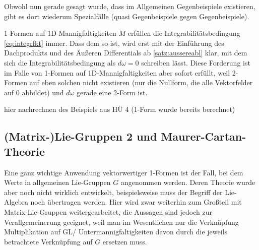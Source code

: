 \documentclass[../H_Analysis_main.tex]{subfiles}
\begin{document}
Obwohl nun gerade gesagt wurde, dass im Allgemeinen Gegenbeispiele existieren, gibt es dort wiederum Spezialfälle (quasi Gegenbeispiele gegen Gegenbeispiele).
\begin{bsp}[1D-Mannigfaltigkeit]
1-Formen auf 1D-Mannigfaltigkeiten $M$ erfüllen die Integrabilitätsbedingung \eqref{eq:integrfkt} immer. Dass dem so ist, wird erst mit der Einführung des Dachprodukts und des Äußeren Differentials ab \ref{satz:aussereabl} klar, mit dem sich die Integrabilitätsbedingung als $d\omega = 0$ schreiben lässt. Diese Forderung ist im Falle von 1-Formen auf 1D-Mannigfaltigkeiten aber sofort erfüllt, weil 2-Formen auf eben solchen nicht existieren (nur die Nullform, die alle Vektorfelder auf 0 abbildet) und $d\omega$ gerade eine 2-Form ist.
\end{bsp}


\begin{bsp}
hier nachrechnen des Beispiels aus HÜ 4 (1-Form wurde bereits berechnet)
\end{bsp}



		\subsection{(Matrix-)Lie-Gruppen 2 und Maurer-Cartan-Theorie}
Eine ganz wichtige Anwendung vektorwertiger 1-Formen ist der Fall, bei dem Werte in allgemeinen Lie-Gruppen $G$ angenommen werden. Deren Theorie wurde aber noch nicht wirklich entwickelt, beispielsweise muss der Begriff der Lie-Algebra noch übertragen werden. Hier wird zwar weiterhin zum Großteil mit Matrix-Lie-Gruppen weitergearbeitet, die Aussagen sind jedoch zur Verallgemeinerung geeignet, weil man im Wesentlichen nur die Verknüpfung Multiplikation auf GL/ Untermannigfaltigkeiten davon durch die jeweils betrachtete Verknüpfung auf $G$ ersetzen muss.
\end{document}
